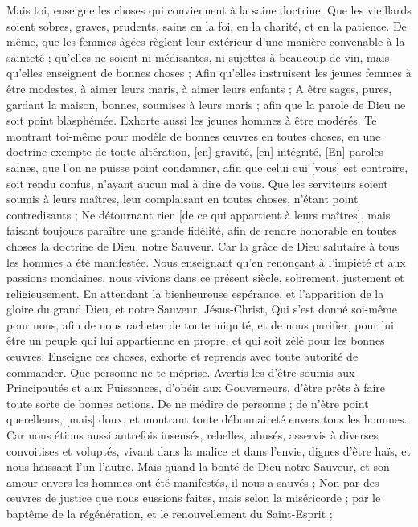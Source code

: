 \begin{multicols}{2}
\VerseOne{}Mais toi, enseigne les choses qui conviennent à la saine doctrine.
Que les vieillards soient sobres, graves, prudents, sains en la foi, en la charité, et en la patience.
De même, que les femmes âgées règlent leur extérieur d'une manière convenable à la sainteté ; qu'elles ne soient ni médisantes, ni sujettes à beaucoup de vin, mais qu'elles enseignent de bonnes choses ;
Afin qu'elles instruisent les jeunes femmes à être modestes, à aimer leurs maris, à aimer leurs enfants ;
A être sages, pures, gardant la maison, bonnes, soumises à leurs maris ; afin que la parole de Dieu ne soit point blasphémée.
Exhorte aussi les jeunes hommes à être modérés.
Te montrant toi-même pour modèle de bonnes œuvres en toutes choses, en une doctrine exempte de toute altération, [en] gravité, [en] intégrité,
[En] paroles saines, que l'on ne puisse point condamner, afin que celui qui [vous] est contraire, soit rendu confus, n'ayant aucun mal à dire de vous.
Que les serviteurs soient soumis à leurs maîtres, leur complaisant en toutes choses, n'étant point contredisants ;
Ne détournant rien [de ce qui appartient à leurs maîtres], mais faisant toujours paraître une grande fidélité, afin de rendre honorable en toutes choses la doctrine de Dieu, notre Sauveur.
Car la grâce de Dieu salutaire à tous les hommes a été manifestée.
Nous enseignant qu'en renonçant à l'impiété et aux passions mondaines, nous vivions dans ce présent siècle, sobrement, justement et religieusement.
En attendant la bienheureuse espérance, et l'apparition de la gloire du grand Dieu, et notre Sauveur, Jésus-Christ,
Qui s'est donné soi-même pour nous, afin de nous racheter de toute iniquité, et de nous purifier, pour lui être un peuple qui lui appartienne en propre, et qui soit zélé pour les bonnes œuvres.
Enseigne ces choses, exhorte et reprends avec toute autorité de commander. Que personne ne te méprise.
\VerseOne{}Avertis-les d'être soumis aux Principautés et aux Puissances, d'obéir aux Gouverneurs, d'être prêts à faire toute sorte de bonnes actions.
De ne médire de personne ; de n'être point querelleurs, [mais] doux, et montrant toute débonnaireté envers tous les hommes.
Car nous étions aussi autrefois insensés, rebelles, abusés, asservis à diverses convoitises et voluptés, vivant dans la malice et dans l'envie, dignes d'être haïs, et nous haïssant l'un l'autre.
Mais quand la bonté de Dieu notre Sauveur, et son amour envers les hommes ont été manifestés, il nous a sauvés ;
Non par des œuvres de justice que nous eussions faites, mais selon la miséricorde ; par le baptême de la régénération, et le renouvellement du Saint-Esprit ;

\end{multicols}
